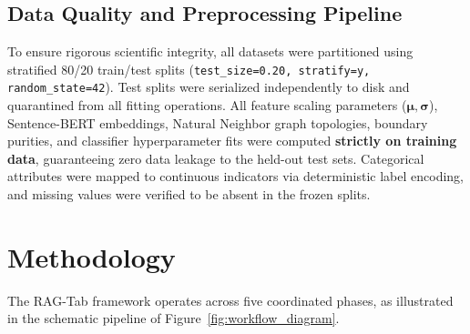 \documentclass[sn-basic]{sn-jnl}
\begin{document}
\subsection{Data Quality and Preprocessing Pipeline}
To ensure rigorous scientific integrity, all datasets were partitioned using stratified 80/20 train/test splits (\texttt{test\_size=0.20, stratify=y, random\_state=42}). Test splits were serialized independently to disk and quarantined from all fitting operations. All feature scaling parameters ($\boldsymbol{\mu}, \boldsymbol{\sigma}$), Sentence-BERT embeddings, Natural Neighbor graph topologies, boundary purities, and classifier hyperparameter fits were computed \textbf{strictly on training data}, guaranteeing zero data leakage to the held-out test sets. Categorical attributes were mapped to continuous indicators via deterministic label encoding, and missing values were verified to be absent in the frozen splits.

\section{Methodology}
\label{sec:methodology}

The RAG-Tab framework operates across five coordinated phases, as illustrated in the schematic pipeline of Figure~\ref{fig:workflow_diagram}.
\end{document}
